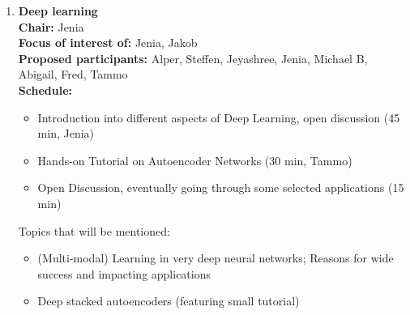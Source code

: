 \documentclass[10pt, a4paper,twoside,american]{article}
\begin{document}
\begin{enumerate}[resume]
\item {\large\bf Deep learning}\\[1ex]
  {\bf Chair:} Jenia \\[1ex]
  {\bf Focus of interest of:} Jenia, Jakob\\[1ex]
  {\bf Proposed participants:} Alper, Steffen, Jeyashree, Jenia, Michael B, Abigail, Fred, Tammo\\[1ex]
  {\bf Schedule:}
  \begin{itemize}
  \item Introduction into different aspects of Deep Learning, open discussion (45 min, Jenia)
  \item Hands-on Tutorial on Autoencoder Networks (30 min, Tammo)
  \item Open Discussion, eventually going through some selected applications (15 min)
  \end{itemize}
  
  Topics that will be mentioned:
  \begin{itemize}
  \item (Multi-modal) Learning in very deep neural networks; Reasons for wide success and impacting applications
  \item  Deep stacked autoencoders (featuring small tutorial)
  \end{itemize}
\end{enumerate}

\end{document}
